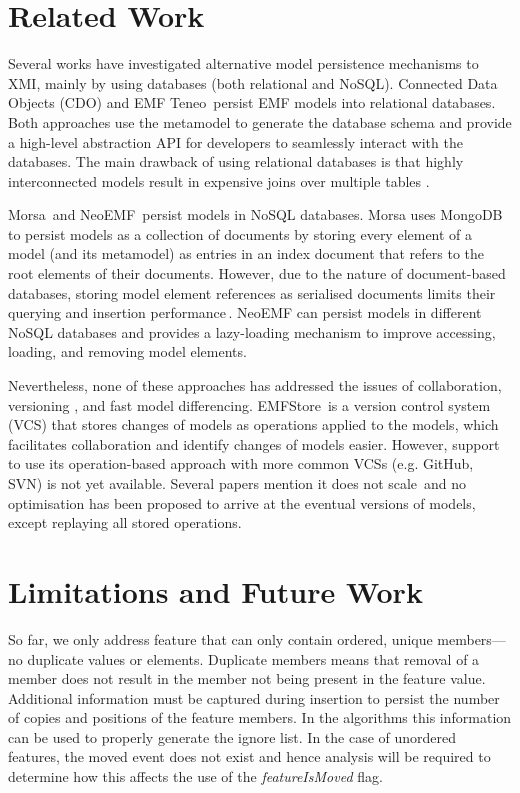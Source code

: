 \documentclass{llncs}
\begin{document}
\section{Related Work}
\label{sec:related_work}
Several works have investigated alternative model persistence mechanisms to XMI, mainly by using databases (both relational and NoSQL). Connected Data Objects (CDO) \cite{eclipse2017cdo} and EMF Teneo\,\cite{eclipse2017teneo} persist EMF models into relational databases. Both approaches use the metamodel to generate the database schema and provide a high-level abstraction API for developers to seamlessly interact with the databases. The main drawback of using relational databases is that highly interconnected models result in expensive joins over multiple tables \cite{barmpis2014evaluation}. 

Morsa\,\cite{pagan2011morsa} and NeoEMF\,\cite{daniel2016neoemf} persist models in NoSQL databases.
Morsa uses MongoDB\,\cite{mongodb2017what} to persist models as a collection of documents by storing every element of a model (and its metamodel) as entries in an index document that refers to the root elements of their documents.%
However, due to the nature of document-based databases, storing model element references as serialised documents limits their querying and insertion performance\,\cite{barmpis2014evaluation}.
NeoEMF can persist models in different NoSQL databases and provides a lazy-loading mechanism to improve accessing, loading, and removing model elements.

Nevertheless, none of these approaches has addressed the issues of collaboration, versioning , and fast model differencing.
EMFStore\,\cite{koegel2010emfstore} is a version control system (VCS) that stores changes of models as operations applied to the models, which facilitates collaboration and identify changes of models easier.
However, support to use its operation-based approach with more common VCSs (e.g. GitHub, SVN) is not yet available. Several papers mention it does not scale\,\cite{pagan2011morsa,kolovos2013research} and no optimisation has been proposed to arrive at the eventual versions of models, except replaying all stored operations. 


\section{Limitations and Future Work}
\label{sec:limitations_and_future_work}
So far, we only address feature that can only contain ordered, unique members---no duplicate values or elements.
Duplicate members means that removal of a member does not result in the member not being present in the feature value.
Additional information must be captured during insertion to persist the number of copies and positions of the feature members.
In the algorithms this information can be used to properly generate the ignore list.
In the case of unordered features, the moved event does not exist and hence analysis will be required to determine how this affects the use of the \emph{featureIsMoved} flag.
\end{document}
